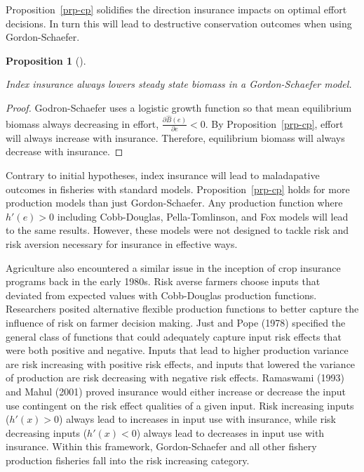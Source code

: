 \documentclass[
  letterpaper,
  DIV=11,
  numbers=noendperiod]{scrartcl}
\theoremstyle{plain}
\newtheorem{proposition}{Proposition}[section]
\theoremstyle{plain}
\theoremstyle{remark}
\begin{document}
Proposition~\ref{prp-cp} solidifies the direction insurance impacts on
optimal effort decisions. In turn this will lead to destructive
conservation outcomes when using Gordon-Schaefer.

\begin{proposition}[]\protect\hypertarget{prp-synas}{}\label{prp-synas}

Index insurance always lowers steady state biomass in a Gordon-Schaefer
model.

\end{proposition}

\begin{proof}

Godron-Schaefer uses a logistic growth function so that mean equilibrium
biomass always decreasing in effort,
\(\frac{\partial\hat{B}(e)}{\partial e}<0\). By
Proposition~\ref{prp-cp}, effort will always increase with insurance.
Therefore, equilibrium biomass will always decrease with insurance.

\end{proof}

Contrary to initial hypotheses, index insurance will lead to
maladapative outcomes in fisheries with standard models.
Proposition~\ref{prp-cp} holds for more production models than just
Gordon-Schaefer. Any production function where \(h'(e)>0\) including
Cobb-Douglas, Pella-Tomlinson, and Fox models will lead to the same
results. However, these models were not designed to tackle risk and risk
aversion necessary for insurance in effective ways.

Agriculture also encountered a similar issue in the inception of crop
insurance programs back in the early 1980s. Risk averse farmers choose
inputs that deviated from expected values with Cobb-Douglas production
functions. Researchers posited alternative flexible production functions
to better capture the influence of risk on farmer decision making. Just
and Pope (1978) specified the general class of functions that could
adequately capture input risk effects that were both positive and
negative. Inputs that lead to higher production variance are risk
increasing with positive risk effects, and inputs that lowered the
variance of production are risk decreasing with negative risk effects.
Ramaswami (1993) and Mahul (2001) proved insurance would either increase
or decrease the input use contingent on the risk effect qualities of a
given input. Risk increasing inputs (\(h'(x)>0\)) always lead to
increases in input use with insurance, while risk decreasing inputs
(\(h'(x)<0\)) always lead to decreases in input use with insurance.
Within this framework, Gordon-Schaefer and all other fishery production
fisheries fall into the risk increasing category.
\end{document}
